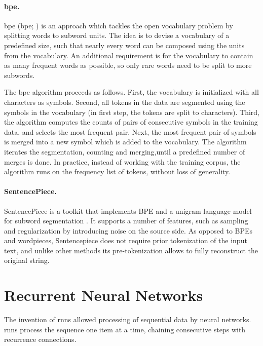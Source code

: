 \paragraph{\acrshort{bpe}.}
\Acrlong{bpe} (\acrshort{bpe}; \citealp{sennrich2016bpe}) is an approach which tackles the
open vocabulary problem by splitting words to subword units.  The
idea is to devise a vocabulary of a predefined size, such that nearly every
word can be composed using the units from the vocabulary. An additional
requirement is for the vocabulary to contain as many frequent words as
possible, so only rare words need to be split to more subwords.

The \gls{bpe} algorithm %
proceeds as follows. First, the vocabulary is initialized with all characters 
as symbols. Second, all tokens in the data are segmented using the symbols in
the vocabulary (in first step, the tokens are split to characters).
Third, the algorithm computes the counts of pairs of consecutive
symbols in the training data, and selects the most frequent pair. Next,
the most frequent pair of symbols is merged into a new symbol which is added to 
the vocabulary. The algorithm iterates the segmentation, counting and 
merging,until a predefined number of merges is done. In practice, instead 
of working with the training corpus, the algorithm runs on the frequency 
list of tokens, without loss of generality.

\paragraph{SentencePiece.} 
 SentencePiece \citep{kudo2018sentencepiece} is a
toolkit that implements BPE and a unigram language model for subword
segmentation \citep{kudo-2018-subword}. It supports a number of features, such as sampling and
regularization by introducing noise on the source side. As opposed to BPEs and
wordpieces, Sentencepiece does not require prior tokenization of the input
text, and unlike other methods its pre-tokenization allows to fully reconstruct
the original string.



\section{Recurrent Neural Networks}
\label{sec:rnn}

The invention of \glspl{rnn} \citep{elman1990finding} allowed processing
of sequential data by neural networks. \Glspl{rnn} process the sequence
one item at a time, chaining consecutive steps with recurrence connections.

